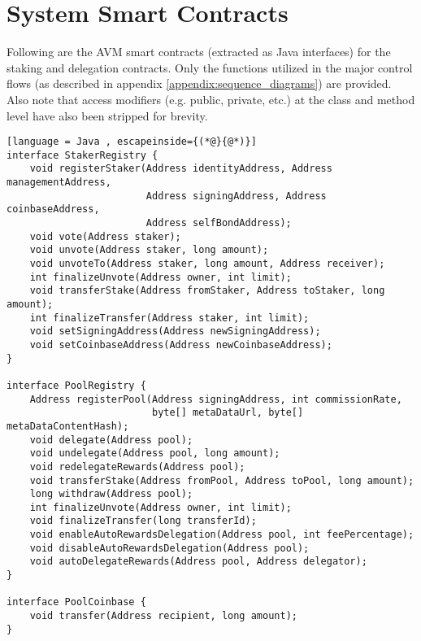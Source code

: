 

\section{System Smart Contracts}
\label{appendix:contract}

Following are the AVM smart contracts (extracted as Java interfaces) for the staking and delegation contracts. Only the functions utilized in the major control flows (as described in appendix \ref{appendix:sequence_diagrams}) are provided. Also note that access modifiers (e.g. public, private, etc.) at the class and method level have also been stripped for brevity.

\begin{lstlisting}[language = Java , escapeinside={(*@}{@*)}]
interface StakerRegistry {
    void registerStaker(Address identityAddress, Address managementAddress,
                        Address signingAddress, Address coinbaseAddress, 
                        Address selfBondAddress);
    void vote(Address staker);
    void unvote(Address staker, long amount);
    void unvoteTo(Address staker, long amount, Address receiver);
    int finalizeUnvote(Address owner, int limit);
    void transferStake(Address fromStaker, Address toStaker, long amount);
    int finalizeTransfer(Address staker, int limit);
    void setSigningAddress(Address newSigningAddress);
    void setCoinbaseAddress(Address newCoinbaseAddress);
}

interface PoolRegistry {
    Address registerPool(Address signingAddress, int commissionRate, 
                         byte[] metaDataUrl, byte[] metaDataContentHash);
    void delegate(Address pool);
    void undelegate(Address pool, long amount);
    void redelegateRewards(Address pool);
    void transferStake(Address fromPool, Address toPool, long amount);
    long withdraw(Address pool);
    int finalizeUnvote(Address owner, int limit);
    void finalizeTransfer(long transferId);
    void enableAutoRewardsDelegation(Address pool, int feePercentage);
    void disableAutoRewardsDelegation(Address pool);
    void autoDelegateRewards(Address pool, Address delegator);
}

interface PoolCoinbase { 
    void transfer(Address recipient, long amount); 
}

\end{lstlisting}
\clearpage